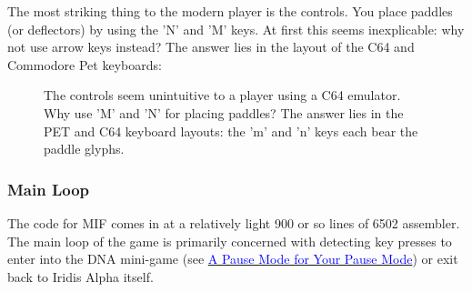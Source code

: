 The most striking thing to the modern player is the controls. You place paddles (or deflectors) by using the 'N' and 'M' keys. At first
this seems inexplicable: why not use arrow keys instead? The answer lies in the layout of the C64 and Commodore Pet keyboards: 
\begin{figure}[H]
  {
    \setlength{\tabcolsep}{3.0pt}
    \setlength\cmidrulewidth{\heavyrulewidth} %
	\centering
	\begin{subfigure}{0.5\textwidth}
	\end{subfigure}
	\begin{subfigure}{0.5\textwidth}
	\end{subfigure}
  }
\caption{ The controls seem unintuitive to a player using a C64 emulator. Why use 'M' and 'N' for placing paddles? The answer lies in the PET
and C64 keyboard layouts: the 'm' and 'n' keys each bear the paddle glyphs.
}
\end{figure}

\subsubsection{Main Loop}
The code for MIF comes in at a relatively light 900 or so lines of 6502
assembler. The main loop of the game is primarily concerned with detecting key
presses to enter into the DNA mini-game (see
\hyperref[sec:dna]{\textcolor{blue}{A Pause Mode for Your Pause Mode}}) or exit
back to Iridis Alpha itself.


